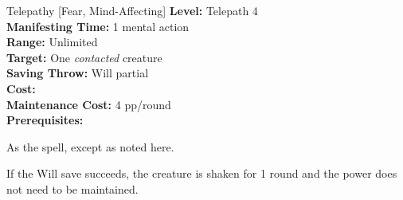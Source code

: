 {Telepathy [Fear, Mind-Affecting]}
{
    \textbf{Level:}
    Telepath 4\\
    \textbf{Manifesting Time:}
    1 mental action\\
    \textbf{Range:}
    Unlimited\\
    \textbf{Target:}
    One \emph{contacted} creature\\
    \textbf{Saving Throw:}
    Will partial\\
    \textbf{Cost:}
    \\
    \textbf{Maintenance Cost:}
    4 pp/round\\
    \textbf{Prerequisites:}
    \\
}
{
    As the  spell, except as noted here.

    If the Will save succeeds, the creature is shaken for 1 round and the power does not need to be maintained.
}
